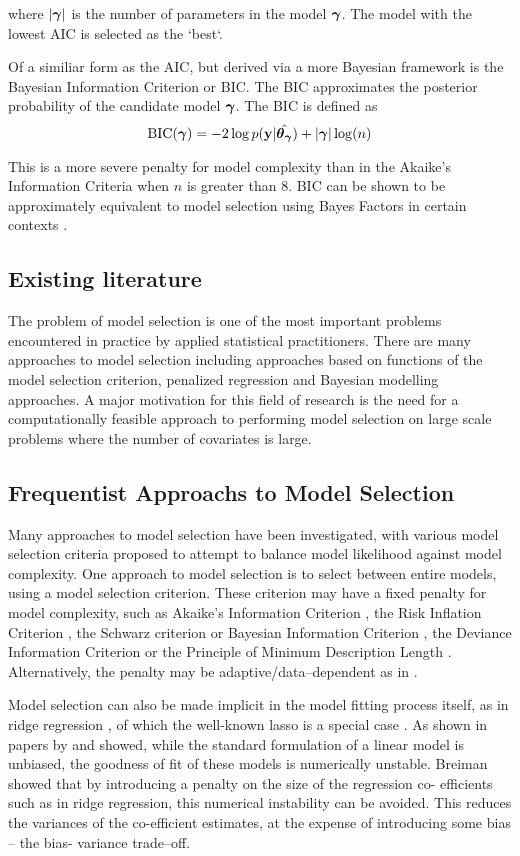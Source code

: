 \documentclass{amsart}[12pt]
\begin{document}
where $|{\boldsymbol \gamma}|$ is the number of parameters in the model ${\boldsymbol \gamma}$. The model with the lowest AIC is selected
as the `best`.

Of a similiar form as the AIC, but derived via a more Bayesian framework is the Bayesian Information Criterion
or BIC. The BIC approximates the posterior probability of the candidate model ${\boldsymbol \gamma}$. The BIC is defined as
\[
	\text{BIC}({\boldsymbol \gamma}) = -2 \log p({\bf y} | \hat{{\boldsymbol \theta}_{\boldsymbol \gamma}}) + |{\boldsymbol \gamma}| \log(n)
\]

This is a more severe penalty for model complexity than in the Akaike's Information Criteria when $n$ is
greater than $8$. BIC can be shown to be approximately equivalent to model selection using Bayes Factors
in certain contexts \cite{Kass1993}.

\subsection{Existing literature}
The problem of model selection is one of the most important problems encountered in practice by applied
statistical practitioners. There are many approaches to model selection including approaches based on
functions of the model selection criterion, penalized regression and Bayesian modelling approaches. A major
motivation for this field of research is the need for a computationally feasible approach to performing model
selection on large scale problems where the number of covariates is large.

\subsection{Frequentist Approachs to Model Selection}
Many approaches to model selection have been investigated, with various model selection criteria proposed to
attempt to balance model likelihood against model complexity. One approach to model selection is to select
between entire models, using a model selection criterion. These criterion may have a fixed penalty for model
complexity, such as Akaike's Information Criterion \citep{Akaike1974}, the Risk Inflation Criterion
\citep{Foster1994}, the Schwarz criterion or Bayesian Information Criterion \citep{Schwarz1978}, the Deviance
Information Criterion \citep{Spiegelhalter2016} or the Principle of Minimum Description Length
\citep{Hansen2001}. Alternatively, the penalty may be adaptive/data--dependent as in \citep{George2000}.

Model selection can also be made implicit in the model fitting process itself, as in ridge regression
\citep{Casella1980}, of which the well-known lasso is a special case \citep{Tibshirani1996}. As shown in
papers by \citep{Breiman1996} and \citep{Efron2013} showed, while  the standard formulation of a linear model
is unbiased, the goodness of fit of these models is numerically  unstable. Breiman showed that by introducing
a penalty on the size of the regression co- efficients such as  in ridge regression, this numerical
instability can be avoided. This reduces the variances of the co-efficient estimates, at the expense of
introducing some bias -- the bias- variance trade--off.
\end{document}
